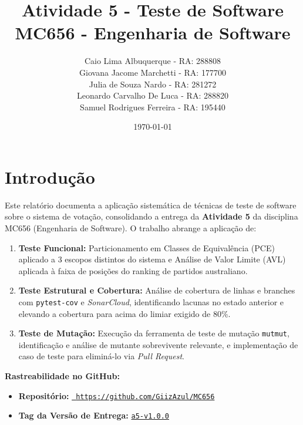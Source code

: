 \documentclass[12pt,a4paper]{article}
\title{\textbf{Atividade 5 - Teste de Software}\\
\large MC656 - Engenharia de Software}
\author{
  Caio Lima Albuquerque - RA: 288808 \\
  Giovana Jacome Marchetti - RA: 177700 \\
  Julia de Souza Nardo - RA: 281272 \\
  Leonardo Carvalho De Luca - RA: 288820\\
  Samuel Rodrigues Ferreira - RA: 195440
}
\date{\today}
\begin{document}
\maketitle

\section{Introdução}
Este relatório documenta a aplicação sistemática de técnicas de teste de software sobre o sistema de votação, consolidando a entrega da \textbf{Atividade 5} da disciplina MC656 (Engenharia de Software). O trabalho abrange a aplicação de:
\begin{enumerate}[leftmargin=1.5em]
    \item \textbf{Teste Funcional:} Particionamento em Classes de Equivalência (PCE) aplicado a 3 escopos distintos do sistema e Análise de Valor Limite (AVL) aplicada à faixa de posições do ranking de partidos australiano.
    \item \textbf{Teste Estrutural e Cobertura:} Análise de cobertura de linhas e branches com \texttt{pytest-cov} e \textit{SonarCloud}, identificando lacunas no estado anterior e elevando a cobertura para acima do limiar exigido de 80\%.
    \item \textbf{Teste de Mutação:} Execução da ferramenta de teste de mutação \texttt{mutmut}, identificação e análise de mutante sobrevivente relevante, e implementação de caso de teste para eliminá-lo via \textit{Pull Request}.
\end{enumerate}

\noindent\textbf{Rastreabilidade no GitHub:}
\begin{itemize}[leftmargin=1.5em]
    \item \textbf{Repositório:} \href{https://github.com/GiizAzul/MC656}{\faGithub\ \texttt{https://github.com/GiizAzul/MC656}}
    \item \textbf{Tag da Versão de Entrega:} \href{https://github.com/GiizAzul/MC656/releases/tag/a5-v1.0.0}{\texttt{a5-v1.0.0}}
\end{itemize}


\end{document}
